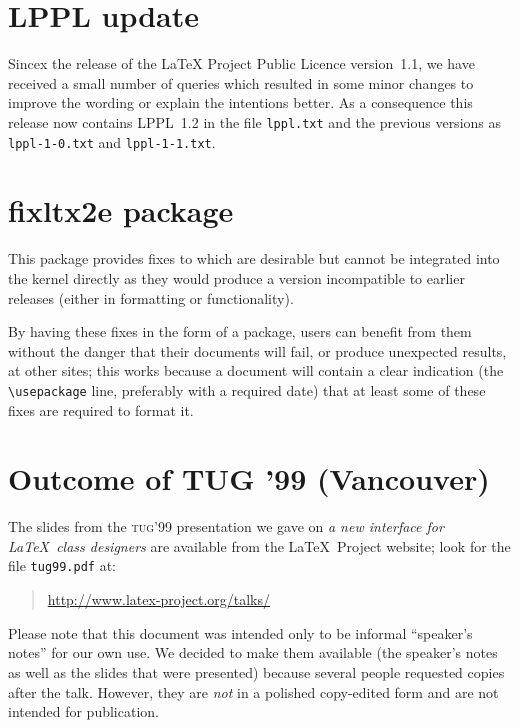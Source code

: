 \documentclass{ltnews}
\providecommand{\acro}[1]{\textsc{\MakeLowercase{#1}}}
\providecommand\file[1]{\texttt{#1}}
\begin{document}
\maketitle

\section{LPPL update}

Sincex the release of the \LaTeX{} Project Public Licence version~1.1,
we have received a small number of queries which resulted in some
minor changes to improve the wording or explain the intentions better.
As a consequence this release now contains LPPL~1.2 in the file
\file{lppl.txt} and the previous versions as \file{lppl-1-0.txt} and
\file{lppl-1-1.txt}.

\section{fixltx2e package}

    This package provides fixes to \LaTeXe{} which are desirable but
    cannot be integrated into the \LaTeXe{} kernel directly as they
    would produce a version incompatible to earlier releases (either
    in formatting or functionality).

    By having these fixes in the form of a package, users can benefit
    from them without the danger that their documents will fail, or
    produce unexpected results, at other sites; this works because a
    document will contain a clear indication (the \verb=\usepackage=
    line, preferably with a required date) that at least some of these
    fixes are required to format it.

\section{Outcome of TUG '99 (Vancouver)}

The slides from the \acro{TUG}'99 presentation we gave on \emph{a
new interface for \LaTeX\ class designers} are available from the
\LaTeX\ Project website; look for the file \verb|tug99.pdf| at:
\begin{quote}
   \url{http://www.latex-project.org/talks/}
\end{quote}

Please note that this document was intended only to be informal
``speaker's notes'' for our own use. We decided to make them available (the
speaker's notes as well as the slides that were presented) because several
people requested copies after the talk. However, they are \emph{not} in
a polished copy-edited form and are not intended for publication.
\end{document}
